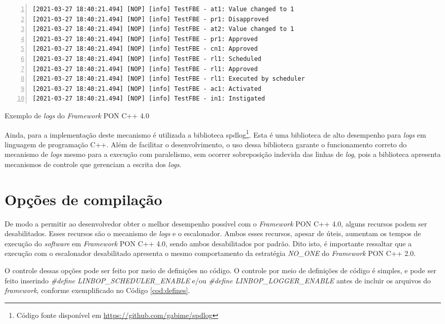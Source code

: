 \begin{table}[!htb]
    \begin{lstlisting}[numbers=left,
    stepnumber=1,frame=lines]
[2021-03-27 18:40:21.494] [NOP] [info] TestFBE - at1: Value changed to 1
[2021-03-27 18:40:21.494] [NOP] [info] TestFBE - pr1: Disapproved
[2021-03-27 18:40:21.494] [NOP] [info] TestFBE - at2: Value changed to 1
[2021-03-27 18:40:21.494] [NOP] [info] TestFBE - pr1: Approved
[2021-03-27 18:40:21.494] [NOP] [info] TestFBE - cn1: Approved
[2021-03-27 18:40:21.494] [NOP] [info] TestFBE - rl1: Scheduled
[2021-03-27 18:40:21.494] [NOP] [info] TestFBE - rl1: Approved
[2021-03-27 18:40:21.494] [NOP] [info] TestFBE - rl1: Executed by scheduler
[2021-03-27 18:40:21.494] [NOP] [info] TestFBE - ac1: Activated
[2021-03-27 18:40:21.494] [NOP] [info] TestFBE - in1: Instigated
\end{lstlisting}
    \caption{Exemplo de \textit{logs} do \textit{Framework} PON C++ 4.0}
    \label{fig:log_fw4}
\end{table}

Ainda, para a implementação deste mecanismo é utilizada a biblioteca
spdlog\footnote{Código fonte disponível em
\url{https://github.com/gabime/spdlog}}. Esta é uma biblioteca de alto
desempenho para \textit{logs} em linguagem de programação C++. Além de facilitar
o desenvolvimento, o uso dessa biblioteca garante o funcionamento correto do
mecanismo de \textit{logs} mesmo para a execução com paralelismo, sem ocorrer
sobreposição indevida das linhas de \textit{log}, pois a biblioteca apresenta
mecanismos de controle que gerenciam a escrita dos \textit{logs}.

\section{Opções de compilação}

De modo a permitir ao desenvolvedor obter o melhor desempenho possível com o
\textit{Framework} PON C++ 4.0, alguns recursos podem ser desabilitados. Esses
recursos são o mecanismo de \textit{logs} e o escalonador. Ambos esses recursos,
apesar de úteis, aumentam os tempos de execução do \textit{software} em
\textit{Framework} PON C++ 4.0, sendo ambos desabilitados por padrão. Dito isto,
é importante ressaltar que a execução com o escalonador desabilitado apresenta o
mesmo comportamento da estratégia \textit{NO\_ONE} do \textit{Framework} PON C++
2.0.

O controle dessas opções pode ser feito por meio de definições no código. O
controle por meio de definições de código é simples, e pode ser feito inserindo
\textit{\#define LINBOP\_SCHEDULER\_ENABLE} e/ou \textit{\#define
LINBOP\_LOGGER\_ENABLE} antes de incluir os arquivos do \textit{framework},
conforme exemplificado no Código \ref{cod:defines}.

